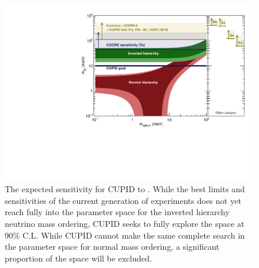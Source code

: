 \begin{figure}
    \centering
    \includegraphics[width=0.8\linewidth]{Figures/Lobster_plot_cupid_mlightest_CL.pdf}
    \caption[The expected sensitivity for CUPID to \zeronubb]{The expected sensitivity for CUPID to \zeronubb.
    While the best limits and sensitivities of the current generation of experiments does not yet reach fully into the parameter space for the inverted hierarchy neutrino mass ordering, CUPID seeks to fully explore the space at 90\% C.L. While CUPID cannot make the same complete search in the parameter space for normal mass ordering, a significant proportion of the space will be excluded.}
    \label{fig:cupid_lobster_plot}
\end{figure}
